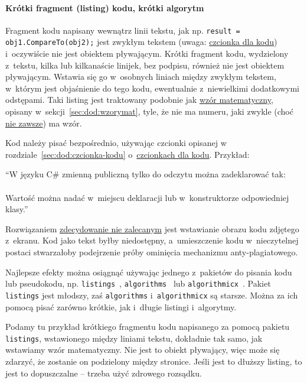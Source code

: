\paragraph{Krótki fragment (listing) kodu, krótki algorytm}
\label{sec:dod:listing-krotki}

Fragment kodu napisany wewnątrz linii tekstu, jak np. {\tt result = obj1.CompareTo(obj2);} jest zwykłym tekstem (uwaga: \hyperref[sec:dod:czcionka-kodu]{czcionka dla kodu}) i~oczywiście nie jest obiektem pływającym. Krótki fragment kodu, wydzielony z~tekstu, kilka lub kilkanaście linijek, bez podpisu, również nie jest obiektem pływającym. Wstawia się go w~osobnych liniach między zwykłym tekstem, w~którym jest objaśnienie do tego kodu, ewentualnie z~niewielkimi dodatkowymi odstępami. Taki listing jest traktowany podobnie jak \hyperref[sec:dod:wzorymat]{wzór matematyczny}, opisany w~sekcji~\ref{sec:dod:wzorymat}, tyle, że nie ma numeru, jaki zwykle (choć \hyperref[not:dod:rownanie-bez-numeru]{nie zawsze}) ma wzór.

Kod należy pisać bezpośrednio, używając czcionki opisanej w rozdziale~\ref{sec:dod:czcionka-kodu} o~\hyperref[sec:dod:czcionka-kodu]{czcionkach dla kodu}. Przykład:

``W języku C\# zmienną publiczną tylko do odczytu można zadeklarować tak:\\[6pt]
\mbox{}\\[6pt]  
Wartość można nadać w~miejscu deklaracji lub w~konstruktorze odpowiedniej klasy.''

Rozwiązaniem \underline{zdecydowanie nie zalecanym} jest wstawianie obrazu kodu zdjętego z~ekranu. Kod jako tekst byłby niedostępny, a~umieszczenie kodu w~nieczytelnej postaci stwarzałoby podejrzenie próby ominięcia mechanizmu anty-plagiatowego. 

Najlepsze efekty można osiągnąć używając jednego z~pakietów do pisania kodu lub pseudokodu, np. {\tt listings}~, {\tt algorithms}~ lub {\tt algorithmicx}~. Pakiet {\tt listings} jest młodszy, zaś {\tt algorithms} i~{\tt algorithmicx} są starsze. Można za ich pomocą pisać zarówno krótkie, jak i~długie listingi i~algorytmy. 

Podamy tu przykład krótkiego fragmentu kodu napisanego za pomocą pakietu {\tt listings}, wstawionego między liniami tekstu, dokładnie tak samo, jak wstawiamy wzór matematyczny. Nie jest to obiekt pływający, więc może się zdarzyć, że zostanie on podzielony między stronice. Jeśli jest to dłuższy listing, to jest to dopuszczalne -- trzeba użyć zdrowego rozsądku.

